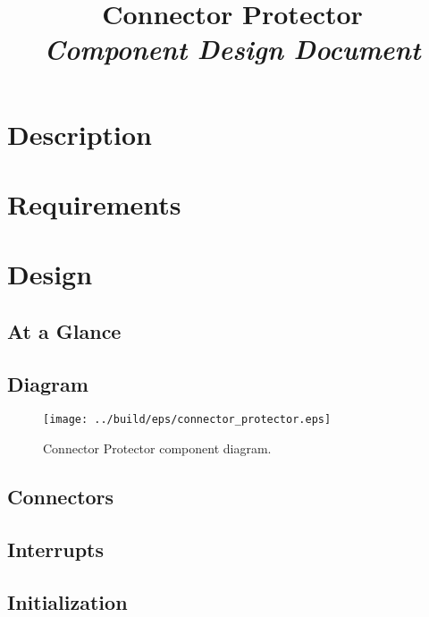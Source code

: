 



\title{\textbf{Connector Protector} \\
\large\textit{Component Design Document}}
\date{}
\maketitle

\section{Description}


\section{Requirements}


\section{Design}

\subsection{At a Glance}


\subsection{Diagram}
\begin{figure}[H]
  \texttt{[image: ../build/eps/connector\_protector.eps]}
  \caption{Connector Protector component diagram.}
\end{figure}

\subsection{Connectors}


\subsection{Interrupts}



\subsection{Initialization}


